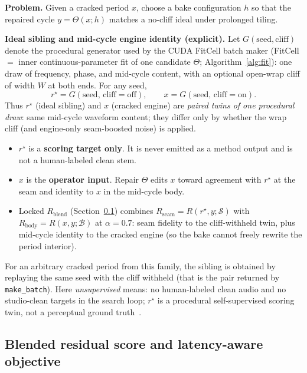 \textbf{Problem.} Given a cracked period $x$, choose a bake configuration $h$ so that the repaired cycle $y=\Theta(x;h)$ matches a no-cliff ideal under prolonged tiling.

\textbf{Ideal sibling and mid-cycle engine identity (explicit).}
Let $G(\mathrm{seed},\mathrm{cliff})$ denote the procedural generator used by the CUDA FitCell batch maker
(FitCell $=$ inner continuous-parameter fit of one candidate $\Theta$; Algorithm~\ref{alg:fit}):
one draw of frequency, phase, and mid-cycle content, with an optional open-wrap cliff of width $W$ at both ends.
For any seed,
\begin{equation}
\label{eq:G-siblings}
r^{\star}=G(\mathrm{seed},\,\mathrm{cliff{=}off}),\qquad
x=G(\mathrm{seed},\,\mathrm{cliff{=}on}).
\end{equation}
Thus $r^{\star}$ (ideal sibling) and $x$ (cracked engine) are \emph{paired twins of one procedural draw}:
same mid-cycle waveform content; they differ only by whether the wrap cliff (and engine-only seam-boosted noise) is applied.
\begin{itemize}
  \item $r^{\star}$ is a \textbf{scoring target only}. It is never emitted as a method output and is not a human-labeled clean stem.
  \item $x$ is the \textbf{operator input}. Repair $\Theta$ edits $x$ toward agreement with $r^{\star}$ at the seam and identity to $x$ in the mid-cycle body.
  \item Locked $R_{\mathrm{blend}}$ (Section~\ref{sec:residual-score}) combines $R_{\mathrm{seam}}=R(r^{\star},y;\mathcal{S})$ with $R_{\mathrm{body}}=R(x,y;\mathcal{B})$ at $\alpha{=}0.7$:
    seam fidelity to the cliff-withheld twin, plus mid-cycle identity to the cracked engine (so the bake cannot freely rewrite the period interior).
\end{itemize}
For an arbitrary cracked period from this family, the sibling is obtained by replaying the same seed with the cliff withheld
(that is the pair returned by \texttt{make\_batch}).
Here \emph{unsupervised} means: no human-labeled clean audio and no studio-clean targets in the search loop;
$r^{\star}$ is a procedural self-supervised scoring twin, not a perceptual ground truth~\cite{lehtinen2018,kashyap2021n2n}.

\subsection{Blended residual score and latency-aware objective}
\label{sec:residual-score}

